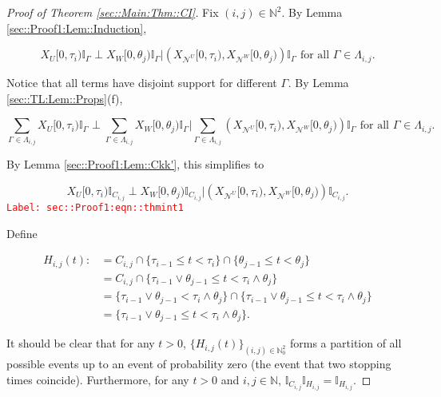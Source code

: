 \documentclass[12pt]{article}
\newcommand{\mb}{\mathbb}
\newcommand{\mc}{\mathcal}
\newcommand{\te}{\text}
\newcommand{\tr}{\textcolor{red}}
\newcommand{\labe}[1]{\tr{\texttt{Label: #1}}}
\renewcommand{\U}{U}							%
\newcommand{\UU}{W}								%
\renewcommand{\t}{t}							%
\newcommand{\X}{X}								%
\newcommand{\neigh}{\mc{N}}						%
\newcommand{\vind}[1]{^{#1}}					%
\newcommand{\cind}[1]{_{#1}}					%
\newcommand{\tip}[1]{#1}						%
\newcommand{\indx}[1]{_{#1}}					%
\newcommand{\rt}{\tau}							%
\newcommand{\rtt}{\theta}						%
\newcommand{\apath}{\Gamma}						%
\newcommand{\pathset}[2]{\Lambda_{#1,#2}}		%
\newcommand{\pathsete}[2]{C_{#1,#2}}			%
\newcommand{\pathseted}[2]{H_{#1,#2}}			%
\begin{document}
\begin{proof}[Proof of Theorem \ref{sec::Main:Thm::CI}]

Fix \((i,j) \in \mb{N}^2\). By Lemma \ref{sec::Proof1:Lem::Induction}, 

\[\X\cind{\U}\tip{[0,\rt\indx{i})}\mb{I}_{\apath\indx{}}\perp \X\cind{\UU}\tip{[0,\rtt\indx{j})}\mb{I}_{\apath\indx{}}\big|\left(\X\cind{\neigh\vind{\U}}\tip{[0,\rt\indx{i})},\X\cind{\neigh\vind{\UU}}\tip{[0,\rtt\indx{j})}\right)\mb{I}_{\apath\indx{}}\te{ for all }\apath\indx{} \in \pathset{i}{j}.\]

Notice that all terms have disjoint support for different \(\apath\indx{}\). By Lemma \ref{sec::TL:Lem::Props}(f), 

\[\sum_{\apath\indx{}\in\pathset{i}{j}}\X\cind{\U}\tip{[0,\rt\indx{i})}\mb{I}_{\apath\indx{}}\perp \sum_{\apath\indx{}\in\pathset{i}{j}}\X\cind{\UU}\tip{[0,\rtt\indx{j})}\mb{I}_{\apath\indx{}}\bigg|\sum_{\apath\indx{}\in\pathset{i}{j}}\left(\X\cind{\neigh\vind{\U}}\tip{[0,\rt\indx{i})},\X\cind{\neigh\vind{\UU}}\tip{[0,\rtt\indx{j})}\right)\mb{I}_{\apath\indx{}}\te{ for all }\apath\indx{} \in \pathset{i}{j}.\]

By Lemma \ref{sec::Proof1:Lem::Ckk'}, this simplifies to 

\begin{equation}
\X\cind{\U}\tip{[0,\rt\indx{i})}\mb{I}_{\pathsete{i}{j}}\perp \X\cind{\UU}\tip{[0,\rtt\indx{j})}\mb{I}_{\pathsete{i}{j}}\big|\left(\X\cind{\neigh\vind{\U}}\tip{[0,\rt\indx{i})},\X\cind{\neigh\vind{\UU}}\tip{[0,\rtt\indx{j})}\right)\mb{I}_{\pathsete{i}{j}}.
\label{sec::Proof1:eqn::thmint1}
\end{equation}
\labe{sec::Proof1:eqn::thmint1}

Define

\begin{align*}
\pathseted{i}{j}(\t) :&= \pathsete{i}{j}\cap \{\rt\indx{i-1}\leq \t < \rt\indx{i}\}\cap \{\rtt\indx{j-1} \leq \t < \rtt\indx{j}\}\\
&=\pathsete{i}{j}\cap\{\rt\indx{i-1}\vee\rtt\indx{j-1} \leq \t < \rt\indx{i}\wedge \rtt\indx{j}\}\\
&=\{\rt\indx{i-1}\vee\rtt\indx{j-1}  < \rt\indx{i}\wedge \rtt\indx{j}\} \cap \{\rt\indx{i-1}\vee\rtt\indx{j-1} \leq \t < \rt\indx{i}\wedge \rtt\indx{j}\}\\
&= \{\rt\indx{i-1}\vee\rtt\indx{j-1} \leq \t < \rt\indx{i}\wedge \rtt\indx{j}\}.
\end{align*}

It should be clear that for any \(\t > 0\), \(\{\pathseted{i}{j}(\t)\}_{(i,j)\in\mb{N}_0^2}\) forms a partition of all possible events up to an event of probability zero (the event that two stopping times coincide). Furthermore, for any \(\t > 0\) and \(i,j\in \mb{N}\), \(\mb{I}_{\pathsete{i}{j}}\mb{I}_{\pathseted{i}{j}} = \mb{I}_{\pathseted{i}{j}}\).


\end{proof}
\end{document}
